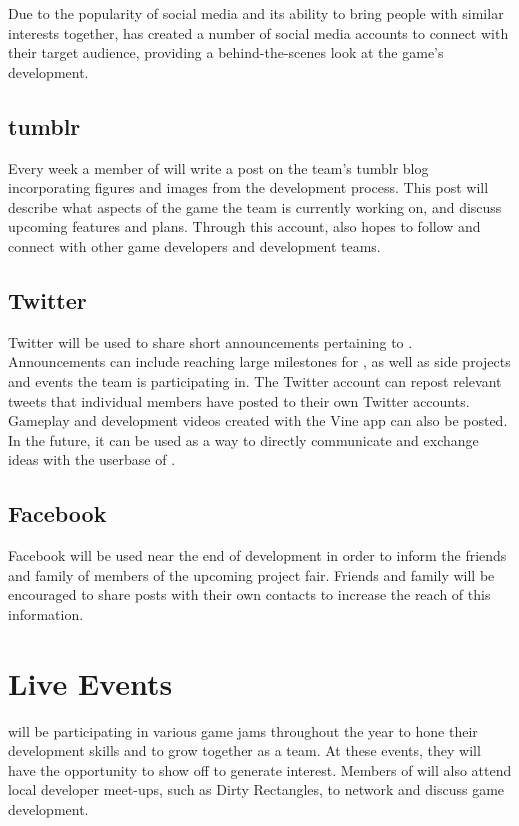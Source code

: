 \documentclass{GlobalDocument}
\begin{document}
Due to the popularity of social media and its ability to bring people with similar interests together, \ourteam{} has created a number of social media accounts to connect with their target audience, providing a behind-the-scenes look at the game's development.

\subsection{tumblr}
Every week a member of \ourteam{} will write a post on the team's tumblr blog incorporating figures and images from the development process. This post will describe what aspects of the game the team is currently working on, and discuss upcoming features and plans. Through this account, \ourteam{} also hopes to follow and connect with other game developers and development teams.

\subsection{Twitter}
Twitter will be used to share short announcements pertaining to \ourteam{}. Announcements can include reaching large milestones for \ourgame{}, as well as side projects and events the team is participating in. The Twitter account can repost relevant tweets that individual members have posted to their own Twitter accounts. Gameplay and development videos created with the Vine app can also be posted. In the future, it can be used as a way to directly communicate and exchange ideas with the userbase of \ourgame{}.

\subsection{Facebook}
Facebook will be used near the end of development in order to inform the friends and family of \ourteam{} members of the upcoming project fair. Friends and family will be encouraged to share posts with their own contacts to increase the reach of this information.

\section{Live Events}
\ourteam{} will be participating in various game jams throughout the year to hone their development skills and to grow together as a team. At these events, they will have the opportunity to show off \ourengine{} to generate interest. Members of \ourteam{} will also attend local developer meet-ups, such as Dirty Rectangles, to network and discuss game development.
\end{document}

